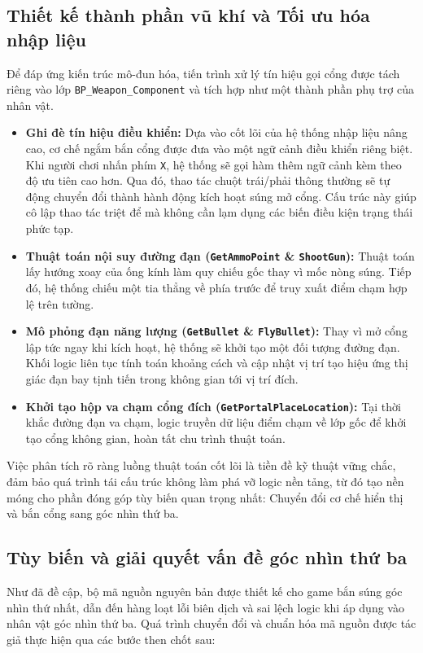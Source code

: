 \documentclass[../DoAn.tex]{subfiles}
\begin{document}
\subsection{Thiết kế thành phần vũ khí và Tối ưu hóa nhập liệu}
Để đáp ứng kiến trúc mô-đun hóa, tiến trình xử lý tín hiệu gọi cổng được tách riêng vào lớp \texttt{BP\_Weapon\_Component} và tích hợp như một thành phần phụ trợ của nhân vật.
\begin{itemize}
    \item \textbf{Ghi đè tín hiệu điều khiển:} Dựa vào cốt lõi của hệ thống nhập liệu nâng cao, cơ chế ngắm bắn cổng được đưa vào một ngữ cảnh điều khiển riêng biệt. Khi người chơi nhấn phím \texttt{X}, hệ thống sẽ gọi hàm thêm ngữ cảnh kèm theo độ ưu tiên cao hơn. Qua đó, thao tác chuột trái/phải thông thường sẽ tự động chuyển đổi thành hành động kích hoạt súng mở cổng. Cấu trúc này giúp cô lập thao tác triệt để mà không cần lạm dụng các biến điều kiện trạng thái phức tạp.
    \item \textbf{Thuật toán nội suy đường đạn (\texttt{GetAmmoPoint} \& \texttt{ShootGun}):} Thuật toán lấy hướng xoay của ống kính làm quy chiếu gốc thay vì mốc nòng súng. Tiếp đó, hệ thống chiếu một tia thẳng về phía trước để truy xuất điểm chạm hợp lệ trên tường.
    \item \textbf{Mô phỏng đạn năng lượng (\texttt{GetBullet} \& \texttt{FlyBullet}):} Thay vì mở cổng lập tức ngay khi kích hoạt, hệ thống sẽ khởi tạo một đối tượng đường đạn. Khối logic liên tục tính toán khoảng cách và cập nhật vị trí tạo hiệu ứng thị giác đạn bay tịnh tiến trong không gian tới vị trí đích.
    \item \textbf{Khởi tạo hộp va chạm cổng đích (\texttt{GetPortalPlaceLocation}):} Tại thời khắc đường đạn va chạm, logic truyền dữ liệu điểm chạm về lớp gốc để khởi tạo cổng không gian, hoàn tất chu trình thuật toán.
\end{itemize}

Việc phân tích rõ ràng luồng thuật toán cốt lõi là tiền đề kỹ thuật vững chắc, đảm bảo quá trình tái cấu trúc không làm phá vỡ logic nền tảng, từ đó tạo nền móng cho phần đóng góp tùy biến quan trọng nhất: Chuyển đổi cơ chế hiển thị và bắn cổng sang góc nhìn thứ ba.

\subsection{Tùy biến và giải quyết vấn đề góc nhìn thứ ba}
Như đã đề cập, bộ mã nguồn nguyên bản được thiết kế cho game bắn súng góc nhìn thứ nhất, dẫn đến hàng loạt lỗi biên dịch và sai lệch logic khi áp dụng vào nhân vật góc nhìn thứ ba. Quá trình chuyển đổi và chuẩn hóa mã nguồn được tác giả thực hiện qua các bước then chốt sau:
\end{document}
